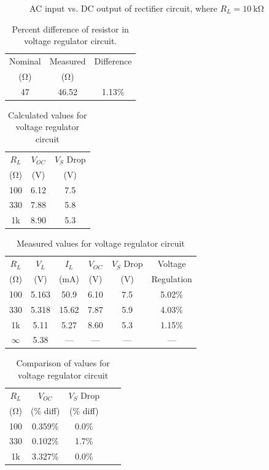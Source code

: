 \documentclass{article}
\begin{document}
\begin{figure}[hbtp]
  \centering
  
  \caption{\label{fig:rect_vp_vdc} AC input vs. DC output of rectifier circuit, where $R_L=\SI{10}{\kilo\ohm}$}
\end{figure}

\begin{table}[hbtp]
  \centering
  \begin{tabular}{ccc}
    Nominal & Measured & Difference \\
    (\si{\ohm}) & (\si{\ohm}) & \\
    \hline
    47 & 46.52 & 1.13\% \\
  \end{tabular}
  \caption{\label{tab:res} Percent difference of resistor in voltage regulator circuit.}
\end{table}

\begin{table}
  \centering
  \begin{tabular}{ccc}
    $R_L$ & $V_{OC}$ & $V_S$ Drop \\
    (\si{\ohm})  & (\si{V}) & (\si{V}) \\
    \hline
    100 & 6.12 & 7.5 \\
    330 & 7.88 & 5.8 \\
    1k & 8.90 & 5.3 \\
  \end{tabular}
  \caption{\label{tab:volt_reg_calc} Calculated values for voltage regulator circuit}
\end{table}

\begin{table}
  \centering
  \begin{tabular}{cccccc}
    $R_L$ & $V_L$ & $I_L$ & $V_{OC}$ & $V_S$ Drop & Voltage \\
    (\si{\ohm}) & (\si{V}) & (\si{mA}) & (\si{V}) & (\si{V}) & Regulation \\
    \hline
    100 & 5.163 & 50.9 & 6.10 & 7.5 & 5.02\%  \\
    330 & 5.318 & 15.62 & 7.87 & 5.9 & 4.03\% \\
    1k & 5.11 & 5.27 & 8.60 & 5.3 & 1.15\% \\
    $\infty$ & 5.38 & --- & --- & --- & ---\\
  \end{tabular}
  \caption{\label{tab:volt_reg_meas} Measured values for voltage regulator circuit}
\end{table}

\begin{table}
  \centering
  \begin{tabular}{ccccc}
    $R_L$ & $V_{OC}$ & $V_S$ Drop \\
    (\si{\ohm}) & (\% diff) & (\% diff) \\
    \hline
    100 & 0.359\% & 0.0\% \\
    330 & 0.102\% & 1.7\% \\
    1k & 3.327\% & 0.0\% \\
  \end{tabular}
  \caption{\label{tab:volt_reg_diff} Comparison of values for voltage regulator circuit}
\end{table}
\end{document}
